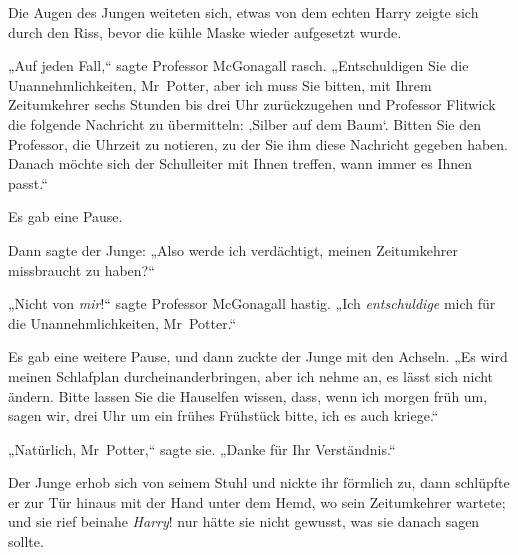 Die Augen des Jungen weiteten sich, etwas von dem echten Harry zeigte sich durch den Riss, bevor die kühle Maske wieder aufgesetzt wurde.

„Auf jeden Fall,“ sagte Professor McGonagall rasch. „Entschuldigen Sie die Unannehmlichkeiten, Mr~Potter, aber ich muss Sie bitten, mit Ihrem Zeitumkehrer sechs Stunden bis drei Uhr zurückzugehen und Professor Flitwick die folgende Nachricht zu übermitteln: ‚Silber auf dem Baum`. Bitten Sie den Professor, die Uhrzeit zu notieren, zu der Sie ihm diese Nachricht gegeben haben. Danach möchte sich der Schulleiter mit Ihnen treffen, wann immer es Ihnen passt.“

Es gab eine Pause.

Dann sagte der Junge: „Also werde ich verdächtigt, meinen Zeitumkehrer missbraucht zu haben?“

„Nicht von \emph{mir}!“ sagte Professor McGonagall hastig. „Ich \emph{entschuldige} mich für die Unannehmlichkeiten, Mr~Potter.“

Es gab eine weitere Pause, und dann zuckte der Junge mit den Achseln. „Es wird meinen Schlafplan durcheinanderbringen, aber ich nehme an, es lässt sich nicht ändern. Bitte lassen Sie die Hauselfen wissen, dass, wenn ich morgen früh um, sagen wir, drei Uhr um ein frühes Frühstück bitte, ich es auch kriege.“

„Natürlich, Mr~Potter,“ sagte sie. „Danke für Ihr Verständnis.“

Der Junge erhob sich von seinem Stuhl und nickte ihr förmlich zu, dann schlüpfte er zur Tür hinaus mit der Hand unter dem Hemd, wo sein Zeitumkehrer wartete; und sie rief beinahe \emph{Harry}! nur hätte sie nicht gewusst, was sie danach sagen sollte.

